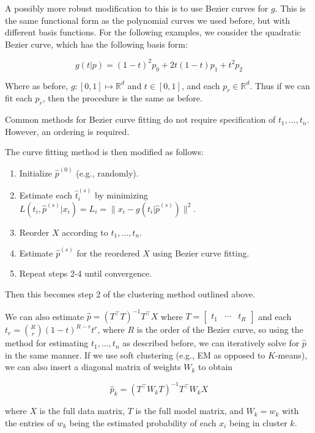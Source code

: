 \documentclass[
  11pt,
]{article}
\providecommand{\tightlist}{%
  \setlength{\itemsep}{0pt}\setlength{\parskip}{0pt}}
\begin{document}
A possibly more robust modification to this is to use Bezier curves for
\(g\). This is the same functional form as the polynomial curves we used
before, but with different basis functions. For the following examples,
we consider the quadratic Bezier curve, which has the following basis
form:

\[
g(t | p) = (1 - t)^2 p_0 + 2 t (1 - t) p_1 + t^2 p_2
\]

Where as before, \(g : [0, 1] \mapsto \mathbb{R}^d\) and
\(t \in [0, 1]\), and each \(p_r \in \mathbb{R}^d\). Thus if we can fit
each \(p_r\), then the procedure is the same as before.

Common methods for Bezier curve fitting do not require specification of
\(t_1, ..., t_n\). However, an ordering is required.

The curve fitting method is then modified as follows:

\begin{enumerate}
\def\labelenumi{\arabic{enumi}.}
\tightlist
\item
  Initialize \(\hat{p}^{(0)}\) (e.g., randomly).
\item
  Estimate each \(\hat{t}_i^{(s)}\) by minimizing
  \(L(t_i, \hat{p}^{(s)} | x_i) = L_i = \|x_i - g(t_i | \hat{p}^{(s)})\|^2\).
\item
  Reorder \(X\) according to \(t_1, ..., t_n\).
\item
  Estimate \(\hat{p}^{(s)}\) for the reordered \(X\) using Bezier curve
  fitting.
\item
  Repeat steps 2-4 until convergence.
\end{enumerate}

Then this becomes step 2 of the clustering method outlined above.

We can also estimate \(\hat{p} = (T^\top T)^{-1} T^\top X\) where
\(T = \begin{bmatrix} t_1 & \cdots & t_R \end{bmatrix}\) and each
\(t_r = \binom{R}{r} (1-t)^{R-r} t^r\), where \(R\) is the order of the
Bezier curve, so using the method for estimating \(t_1, ..., t_n\) as
described before, we can iteratively solve for \(\hat{p}\) in the same
manner. If we use soft clustering (e.g., EM as opposed to \(K\)-means),
we can also insert a diagonal matrix of weights \(W_k\) to obtain

\[\hat{p}_k = (T^\top W_k T)^{-1} T^\top W_k X\]

where \(X\) is the full data matrix, \(T\) is the full model matrix, and
\(W_k = w_k\) with the entries of \(w_k\) being the estimated
probability of each \(x_i\) being in cluster \(k\).
\end{document}

